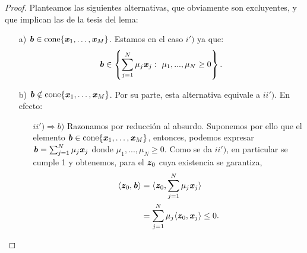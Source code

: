\begin{proof}
	Planteamos las siguientes alternativas, que obviamente son excluyentes, y que implican las de la tesis del lema:
	\begin{itemize}
		\item[a)] $\textbf{\emph{b}} \in \mathrm{cone}\{\textbf{\emph{x}}_1,\dots, \textbf{\emph{x}}_M \} $. Estamos en el caso $ i') $  ya que:
		\[
		\textbf{\emph{b}} \in \left\lbrace \sum_{j=1}^{N}{\mu_j \textbf{\emph{x}}_j } : \text{ } \mu_1,...,\mu_N \geq 0 \right\rbrace .
		\]
		\item[b)] $ \textbf{\emph{b}} \notin \mathrm{cone}\{\textbf{\emph{x}}_1,\dots, \textbf{\emph{x}}_M \} $. Por su parte, esta alternativa equivale a $ ii') $. En efecto: 
		
		\begin{itemize}
			\item[$ ii') \Longrightarrow b) $] Razonamos por reducción al absurdo. Suponemos por ello que el elemento $ \textbf{\emph{b}} \in \mathrm{cone}\{\textbf{\emph{x}}_1,\dots, \textbf{\emph{x}}_M \} $, entonces, podemos expresar $ \textbf{\emph{b}} =  \sum_{j=1}^{N}{\mu_j\textbf{\emph{x}}_j } $ donde $ \mu_1,...,\mu_N \geq 0$. Como se da $ ii') $, en particular se cumple 1 y obtenemos, para el $ \textbf{\emph{z}}_0 $ cuya existencia se garantiza,
			\begin{equation*}
			\begin{split}
			\langle \textbf{\emph{z}}_0, \textbf{\emph{b}} \rangle & = \langle \textbf{\emph{z}}_0, \sum_{j=1}^{N}{\mu_j \textbf{\emph{x}}_j } \rangle \\
			&= \sum_{j=1}^{N}{\mu_j\langle \textbf{\emph{z}}_0, \textbf{\emph{x}}_j \rangle } \leq 0.
			\end{split}
			\end{equation*}
			

\end{itemize}
\end{itemize}
\end{proof}
